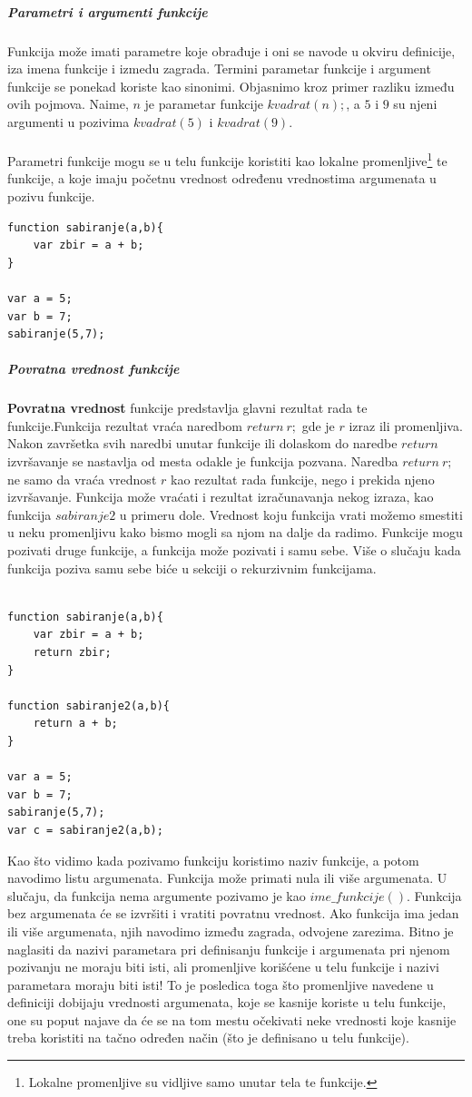 \documentclass[a4paper]{article}
\begin{document}
\subparagraph{Parametri i argumenti funkcije}
Funkcija može imati parametre koje obrađuje i oni se navode u
okviru definicije, iza imena funkcije i izmedu zagrada.
Termini parametar funkcije i argument funkcije se ponekad
koriste kao sinonimi. Objasnimo kroz primer razliku između ovih pojmova. Naime,  $n$ je parametar funkcije $kvadrat(n);$, a $5$ i $9$ su
njeni argumenti u pozivima $kvadrat(5)$ i $kvadrat(9)$.\\\\
Parametri funkcije mogu se u telu funkcije koristiti kao lokalne
promenljive\footnote{Lokalne promenljive su vidljive samo unutar tela te funkcije.} te funkcije, a koje imaju početnu vrednost
određenu vrednostima argumenata u pozivu funkcije.
\begin{lstlisting}[backgroundcolor = \color{lightgray}]
function sabiranje(a,b){
	var zbir = a + b;
}

var a = 5;
var b = 7;
sabiranje(5,7);
\end{lstlisting}

\subparagraph{Povratna vrednost funkcije}
\textbf{Povratna vrednost} funkcije predstavlja glavni rezultat rada te funkcije.Funkcija rezultat vraća naredbom $return\ r;$ gde je $r$ izraz ili promenljiva. Nakon završetka svih naredbi unutar funkcije ili dolaskom do naredbe $return$ izvršavanje se nastavlja od mesta odakle je funkcija pozvana.
Naredba $return\ r;$ ne samo da vraća vrednost $r$ kao rezultat
rada funkcije, nego i prekida njeno izvršavanje. Funkcija može vraćati i rezultat izračunavanja nekog izraza, kao funkcija $sabiranje2$ u primeru dole. Vrednost koju funkcija vrati možemo smestiti u neku promenljivu kako bismo mogli sa njom na dalje da radimo. Funkcije mogu pozivati druge funkcije, a funkcija može pozivati i samu sebe. Više o slučaju kada funkcija poziva samu sebe biće u sekciji o rekurzivnim funkcijama.\\\\

\begin{lstlisting}[backgroundcolor = \color{lightgray}]
function sabiranje(a,b){
	var zbir = a + b;
	return zbir;
}

function sabiranje2(a,b){
	return a + b;
}

var a = 5;
var b = 7;
sabiranje(5,7);
var c = sabiranje2(a,b);
\end{lstlisting}

Kao što vidimo kada pozivamo funkciju koristimo naziv funkcije, a potom navodimo listu argumenata. Funkcija može primati nula ili više argumenata. U slučaju, da funkcija nema argumente pozivamo je kao $ime\_funkcije()$. Funkcija bez argumenata će se izvršiti i vratiti povratnu vrednost. Ako funkcija ima jedan ili više argumenata, njih navodimo između zagrada, odvojene zarezima. Bitno je naglasiti da nazivi parametara pri definisanju funkcije i argumenata pri njenom pozivanju ne moraju biti isti, ali promenljive korišćene u telu funkcije i nazivi parametara moraju biti isti! To je posledica toga što promenljive navedene u definiciji dobijaju vrednosti argumenata, koje se kasnije koriste u telu funkcije, one su poput najave da će se na tom mestu očekivati neke vrednosti koje kasnije treba koristiti na tačno određen način (što je definisano u telu funkcije).  
\end{document}
